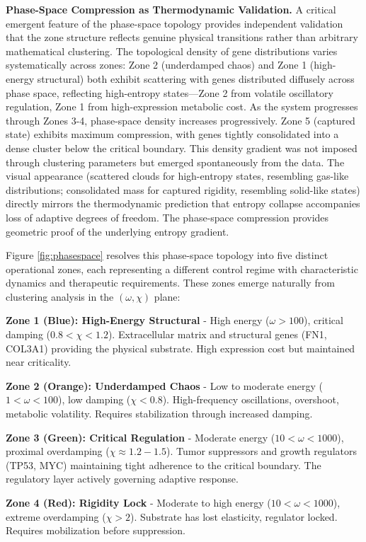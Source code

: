\documentclass[11pt,letterpaper]{article}
\begin{document}
\textbf{Phase-Space Compression as Thermodynamic Validation.} A critical emergent feature of the phase-space topology provides independent validation that the zone structure reflects genuine physical transitions rather than arbitrary mathematical clustering. The topological density of gene distributions varies systematically across zones: Zone 2 (underdamped chaos) and Zone 1 (high-energy structural) both exhibit scattering with genes distributed diffusely across phase space, reflecting high-entropy states—Zone 2 from volatile oscillatory regulation, Zone 1 from high-expression metabolic cost. As the system progresses through Zones 3-4, phase-space density increases progressively. Zone 5 (captured state) exhibits maximum compression, with genes tightly consolidated into a dense cluster below the critical boundary. This density gradient was not imposed through clustering parameters but emerged spontaneously from the data. The visual appearance (scattered clouds for high-entropy states, resembling gas-like distributions; consolidated mass for captured rigidity, resembling solid-like states) directly mirrors the thermodynamic prediction that entropy collapse accompanies loss of adaptive degrees of freedom. The phase-space compression provides geometric proof of the underlying entropy gradient.

Figure \ref{fig:phasespace} resolves this phase-space topology into five distinct operational zones, each representing a different control regime with characteristic dynamics and therapeutic requirements. These zones emerge naturally from clustering analysis in the $(\omega, \chi)$ plane:

\textbf{Zone 1 (Blue): High-Energy Structural} - High energy ($\omega > 100$), critical damping ($0.8 < \chi < 1.2$). Extracellular matrix and structural genes (FN1, COL3A1) providing the physical substrate. High expression cost but maintained near criticality.

\textbf{Zone 2 (Orange): Underdamped Chaos} - Low to moderate energy ($1 < \omega < 100$), low damping ($\chi < 0.8$). High-frequency oscillations, overshoot, metabolic volatility. Requires stabilization through increased damping.

\textbf{Zone 3 (Green): Critical Regulation} - Moderate energy ($10 < \omega < 1000$), proximal overdamping ($\chi \approx 1.2-1.5$). Tumor suppressors and growth regulators (TP53, MYC) maintaining tight adherence to the critical boundary. The regulatory layer actively governing adaptive response.

\textbf{Zone 4 (Red): Rigidity Lock} - Moderate to high energy ($10 < \omega < 1000$), extreme overdamping ($\chi > 2$). Substrate has lost elasticity, regulator locked. Requires mobilization before suppression.
\end{document}

